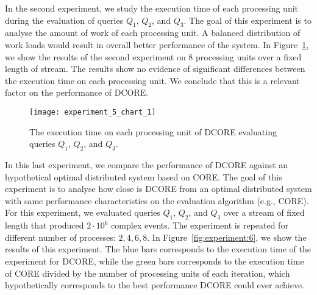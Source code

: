 In the second experiment, we study the execution time of each processing unit during the evaluation of queries $Q_{1}$, $Q_{2}$, and $Q_{3}$. The goal of this experiment is to analyse the amount of work of each processing unit. A balanced distribution of work loads would result in overall better performance of the system. In Figure~\ref{fig:experiment:5}, we show the results of the second experiment on $8$ processing units over a fixed length of stream. The results show no evidence of significant differences between the execution time on each processing unit. We conclude that this is a relevant factor on the performance of DCORE.

\begin{figure}[t]
  \centering
  \texttt{[image: experiment\_5\_chart\_1]}
  \caption{The execution time on each processing unit of DCORE evaluating queries $Q_{1}$, $Q_{2}$, and $Q_{3}$.}
  \label{fig:experiment:5}
\end{figure}

In this last experiment, we compare the performance of DCORE against an hypothetical optimal distributed system based on CORE. The goal of this experiment is to analyse how close is DCORE from an optimal distributed system with same performance characteristics on the evaluation algorithm (e.g., CORE). For this experiment, we evaluated queries $Q_{1}$, $Q_{2}$, and $Q_{3}$ over a stream of fixed length that produced $2 \cdot 10^{6}$ complex events. The experiment is repeated for different number of processes: $2, 4, 6, 8$. In Figure~\ref{fig:experiment:6}, we show the results of this experiment. The blue bars corresponds to the execution time of the experiment for DCORE, while the green bars corresponds to the execution time of CORE divided by the number of processing units of each iteration, which hypothetically corresponds to the best performance DCORE could ever achieve.

